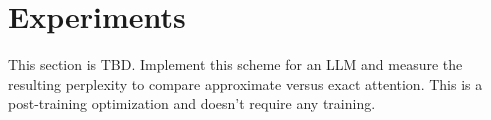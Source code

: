 \documentclass{article}
\numberwithin{equation}{section} %
\begin{document}
\section{Experiments}
This section is TBD. Implement this scheme for an LLM and measure the resulting perplexity to compare approximate versus exact attention. This is a post-training optimization and doesn't require any training.



\end{document}
